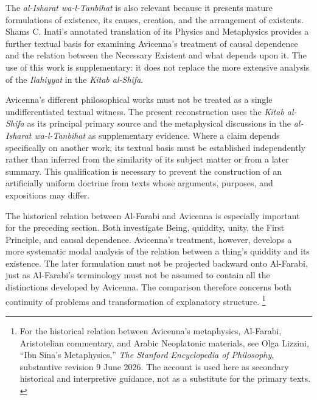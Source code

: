 \label{para:VS.B01.P01.C08.S13.SS02.P003}

The \textit{al-Isharat wa-l-Tanbihat} is also
relevant because it presents mature formulations
of existence, its causes, creation, and the
arrangement of existents. Shams C. Inati's
annotated translation of its Physics and
Metaphysics provides a further textual basis
for examining Avicenna's treatment of causal
dependence and the relation between the
Necessary Existent and what depends upon it.
The use of this work is supplementary: it
does not replace the more extensive analysis
of the \textit{Ilahiyyat} in the
\textit{Kitab al-Shifa}.
\citep[Metaphysics, Fourth--Sixth Classes]{InatiAvicennaRemarksAdmonitions2014}

\label{para:VS.B01.P01.C08.S13.SS02.P004}

Avicenna's different philosophical works must not be treated
as a single undifferentiated textual witness. The present
reconstruction uses the \textit{Kitab al-Shifa} as its principal
primary source and the metaphysical discussions in the
\textit{al-Isharat wa-l-Tanbihat} as supplementary evidence.
Where a claim depends specifically on another work, its
textual basis must be established independently rather than
inferred from the similarity of its subject matter or from
a later summary. This qualification is necessary to prevent
the construction of an artificially uniform doctrine from
texts whose arguments, purposes, and expositions may differ.
\citep[Metaphysics, Books I--II]{AvicennaMetaphysics}

\label{para:VS.B01.P01.C08.S13.SS02.P005}

The historical relation between Al-Farabi
and Avicenna is especially important for
the preceding section. Both investigate
Being, quiddity, unity, the First Principle,
and causal dependence. Avicenna's treatment,
however, develops a more systematic modal
analysis of the relation between a thing's
quiddity and its existence. The later
formulation must not be projected backward
onto Al-Farabi, just as Al-Farabi's
terminology must not be assumed to contain
all the distinctions developed by Avicenna.
The comparison therefore concerns both
continuity of problems and transformation
of explanatory structure.
\footnote{For the historical relation between
Avicenna's metaphysics, Al-Farabi, Aristotelian
commentary, and Arabic Neoplatonic materials,
see Olga Lizzini, ``Ibn Sina's Metaphysics,''
\textit{The Stanford Encyclopedia of Philosophy},
substantive revision 9 June 2026. The account
is used here as secondary historical and
interpretive guidance, not as a substitute
for the primary texts. \cite{LizziniIbnSinaMetaphysicsSEP2026}}


